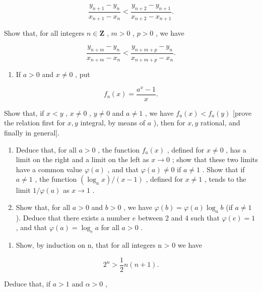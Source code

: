 \[
\frac {y _ {n + 1} - y _ {n}}{x _ {n + 1} - x _ {n}} <   \frac {y _ {n + 2} - y _ {n + 1}}{x _ {n + 2} - x _ {n + 1}}.
\]

Show that, for all integers \(n \in \mathbf{Z}\) , \(m > 0\) , \(p > 0\) , we have

\[
\frac {y _ {n + m} - y _ {n}}{x _ {n + m} - x _ {n}} <   \frac {y _ {n + m + p} - y _ {n}}{x _ {n + m + p} - x _ {n}}.
\]

\begin{enumerate}
\def\labelenumi{\alph{enumi})}
\setcounter{enumi}{1}
\tightlist
\item
  If \(a > 0\) and \(x \neq 0\) , put
\end{enumerate}

\[
f _ {a} (x) = \frac {a ^ {x} - 1}{x}.
\]

Show that, if \(x < y\) , \(x \neq 0\) , \(y \neq 0\) and \(a \neq 1\) , we have \(f_{a}(x) < f_{a}(y)\) {[}prove the relation first for \(x, y\) integral, by means of \(a\) ), then for \(x, y\) rational, and finally in general{]}.

\begin{enumerate}
\def\labelenumi{\alph{enumi})}
\setcounter{enumi}{2}
\item
  Deduce that, for all \(a > 0\) , the function \(f_{a}(x)\) , defined for \(x \neq 0\) , has a limit on the right and a limit on the left as \(x \to 0\) ; show that these two limits have a common value \(\varphi(a)\) , and that \(\varphi(a) \neq 0\) if \(a \neq 1\) . Show that if \(a \neq 1\) , the function \((\log_{a} x) / (x - 1)\) , defined for \(x \neq 1\) , tends to the limit \(1 / \varphi(a)\) as \(x \to 1\) .
\item
  Show that, for all \(a > 0\) and \(b > 0\) , we have \(\varphi(b) = \varphi(a) \log_a b\) (if \(a \neq 1\) ). Deduce that there exists a number \(e\) between 2 and 4 such that \(\varphi(e) = 1\) , and that \(\varphi(a) = \log_e a\) for all \(a > 0\) .
\end{enumerate}

\begin{enumerate}
\def\labelenumi{\arabic{enumi})}
\setcounter{enumi}{1}
\tightlist
\item
  Show, by induction on n, that for all integers n \textgreater{} 0 we have
\end{enumerate}

\[
2 ^ {n} > \frac {1}{2} n (n + 1).
\]

Deduce that, if \(a > 1\) and \(\alpha > 0\) ,

